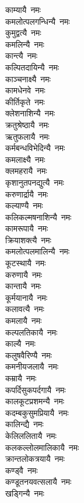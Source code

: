 \begin{multicols}{\maxColumns}
\begin{flushleft}
काम्यायै~नमः\\
कमलोत्पलगन्धिन्यै~नमः\\
कुमुद्वत्यै~नमः\\
कमलिन्यै~नमः\\
कान्त्यै~नमः\\
कल्पितदायिन्यै~नमः\hfill{}\\
काञ्चनाक्ष्यै~नमः\\
कामधेनवे~नमः\\
कीर्तिकृते~नमः\\
क्लेशनाशिन्यै~नमः\\
क्रतुश्रेष्ठायै~नमः\\
ऋतुफलायै~नमः\\
कर्मबन्धविभेदिन्यै~नमः\\
कमलाक्ष्यै~नमः\\
क्लमहरायै~नमः\\
कृशानुतपनद्युत्यै~नमः\hfill{}\\
करुणार्द्रायै~नमः\\
कल्याण्यै~नमः\\
कलिकल्मषनाशिन्यै~नमः\\
कामरूपायै~नमः\\
क्रियाशक्त्यै~नमः\\
कमलोत्पलमालिन्यै~नमः\\
कूटस्थायै~नमः\\
करुणायै~नमः\\
कान्तायै~नमः\\
कूर्मयानायै~नमः\hfill{}\\
कलावत्यै~नमः\\
कमलायै~नमः\\
कल्पलतिकायै~नमः\\
काल्यै~नमः\\
कलुषवैरिण्यै~नमः\\
कमनीयजलायै~नमः\\
कम्रायै~नमः\\
कपर्दिसुकपर्दगायै~नमः\\
कालकूटप्रशमन्यै~नमः\\
कदम्बकुसुमप्रियायै~नमः\hfill{}\\
कालिन्द्यै~नमः\\
केलिललितायै~नमः\\
कलकल्लोलमालिकायै~नमः\\
क्रान्तलोकत्रयायै~नमः\\
कण्ड्वै~नमः\\
कण्डूतनयवत्सलायै~नमः\\
खड्गिन्यै~नमः\\

\end{flushleft}
\end{multicols}
